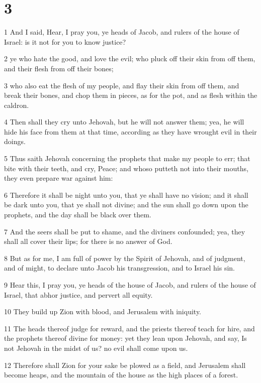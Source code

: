 \chapter{3}

\par 1 And I said, Hear, I pray you, ye heads of Jacob, and rulers of the house of Israel: is it not for you to know justice?
\par 2 ye who hate the good, and love the evil; who pluck off their skin from off them, and their flesh from off their bones;
\par 3 who also eat the flesh of my people, and flay their skin from off them, and break their bones, and chop them in pieces, as for the pot, and as flesh within the caldron.
\par 4 Then shall they cry unto Jehovah, but he will not answer them; yea, he will hide his face from them at that time, according as they have wrought evil in their doings.
\par 5 Thus saith Jehovah concerning the prophets that make my people to err; that bite with their teeth, and cry, Peace; and whoso putteth not into their mouths, they even prepare war against him:
\par 6 Therefore it shall be night unto you, that ye shall have no vision; and it shall be dark unto you, that ye shall not divine; and the sun shall go down upon the prophets, and the day shall be black over them.
\par 7 And the seers shall be put to shame, and the diviners confounded; yea, they shall all cover their lips; for there is no answer of God.
\par 8 But as for me, I am full of power by the Spirit of Jehovah, and of judgment, and of might, to declare unto Jacob his transgression, and to Israel his sin.
\par 9 Hear this, I pray you, ye heads of the house of Jacob, and rulers of the house of Israel, that abhor justice, and pervert all equity.
\par 10 They build up Zion with blood, and Jerusalem with iniquity.
\par 11 The heads thereof judge for reward, and the priests thereof teach for hire, and the prophets thereof divine for money: yet they lean upon Jehovah, and say, Is not Jehovah in the midst of us? no evil shall come upon us.
\par 12 Therefore shall Zion for your sake be plowed as a field, and Jerusalem shall become heaps, and the mountain of the house as the high places of a forest.


